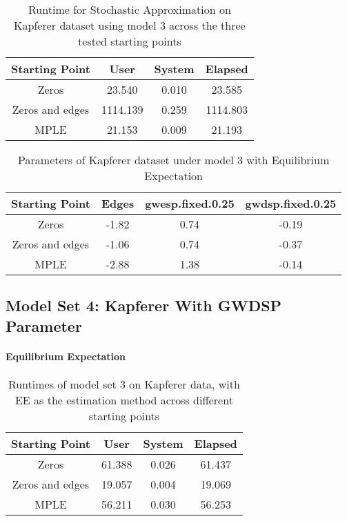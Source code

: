 \begin{table}[H]
\centering
\begin{tabular}{||c|c|c|c||}
\hline
Starting Point & User & System & Elapsed \\
\hline
Zeros & 23.540 & 0.010 & 23.585 \\
\hline
Zeros and edges & 1114.139 & 0.259 & 1114.803 \\
\hline
MPLE & 21.153 & 0.009 & 21.193 \\
\hline
\end{tabular}
\label{t:runtimes_kap1_sa}
\caption{Runtime for Stochastic Approximation on Kapferer dataset using model 3 across the three tested starting points}
\end{table}


\begin{table}[H]
\centering
\begin{tabular}{||c|c|c|c||}
  \hline
  Starting Point & Edges & gwesp.fixed.0.25 & gwdsp.fixed.0.25 \\ 
  \hline
  Zeros & -1.82 & 0.74 & -0.19 \\ 
  \hline
  Zeros and edges & -1.06 & 0.74 & -0.37 \\
  \hline
  MPLE & -2.88 & 1.38 & -0.14 \\
  \hline
\end{tabular}
\label{t:params_kap1_ee}
\caption{Parameters of Kapferer dataset under model 3 with Equilibrium Expectation}
\end{table}


\subsection{Model Set 4: Kapferer With GWDSP Parameter}

\paragraph{Equilibrium Expectation}

\begin{table}[H]
\centering
\begin{tabular}{||c|c|c|c||}
\hline
Starting Point & User & System & Elapsed \\
\hline
Zeros & 61.388 & 0.026 & 61.437 \\
\hline
Zeros and edges & 19.057 & 0.004 & 19.069 \\
\hline
MPLE & 56.211 & 0.030 & 56.253 \\
\hline 
\end{tabular}
\label{t:runtimes_kap2_ee}
\caption{Runtimes of model set 3 on Kapferer data, with EE as the estimation method across different starting points}
\end{table}

